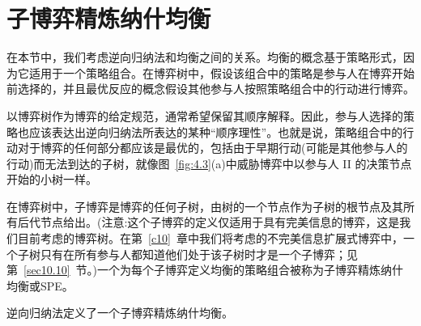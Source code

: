\section{子博弈精炼纳什均衡}\label{sec:4.6}

在本节中，我们考虑逆向归纳法和均衡之间的关系。均衡的概念基于策略形式，因为它适用于一个策略组合。在博弈树中，假设该组合中的策略是参与人在博弈开始前选择的，并且最优反应的概念假设其他参与人按照策略组合中的行动进行博弈。

以博弈树作为博弈的给定规范，通常希望保留其顺序解释。因此，参与人选择的策略也应该表达出逆向归纳法所表达的某种“顺序理性”。也就是说，策略组合中的行动对于博弈的任何部分都应该是最优的，包括由于早期行动(可能是其他参与人的行动)而无法到达的子树，就像图~\ref{fig:4.3}(a)中威胁博弈中以参与人 II 的决策节点开始的小树一样。

在博弈树中，子博弈是博弈的任何子树，由树的一个节点作为子树的根节点及其所有后代节点给出。(注意:这个子博弈的定义仅适用于具有完美信息的博弈，这是我们目前考虑的博弈树。在第~\ref{c10}~章中我们将考虑的不完美信息扩展式博弈中，一个子树只有在所有参与人都知道他们处于该子树时才是一个子博弈；见第~\ref{sec10.10}~节。)一个为每个子博弈定义均衡的策略组合被称为子博弈精炼纳什均衡或SPE。

\begin{theorem}\label{theo:4.6}
    逆向归纳法定义了一个子博弈精炼纳什均衡。
\end{theorem}

